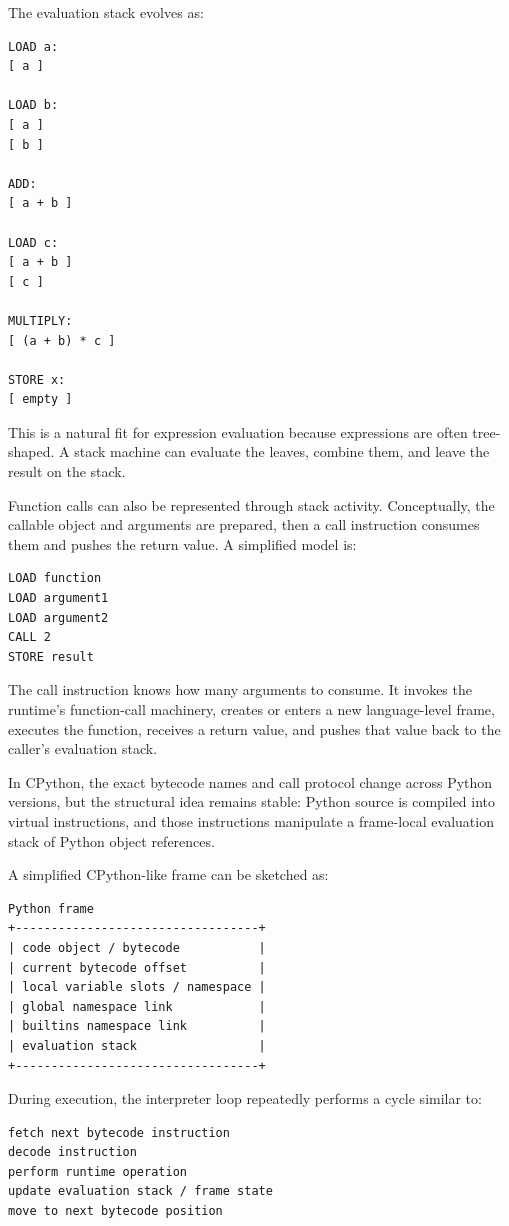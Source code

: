 The evaluation stack evolves as:

\begin{verbatim}
LOAD a:
[ a ]

LOAD b:
[ a ]
[ b ]

ADD:
[ a + b ]

LOAD c:
[ a + b ]
[ c ]

MULTIPLY:
[ (a + b) * c ]

STORE x:
[ empty ]
\end{verbatim}

This is a natural fit for expression evaluation because expressions are often tree-shaped. A stack machine can evaluate the leaves, combine them, and leave the result on the stack.

Function calls can also be represented through stack activity. Conceptually, the callable object and arguments are prepared, then a call instruction consumes them and pushes the return value. A simplified model is:

\begin{verbatim}
LOAD function
LOAD argument1
LOAD argument2
CALL 2
STORE result
\end{verbatim}

The call instruction knows how many arguments to consume. It invokes the runtime's function-call machinery, creates or enters a new language-level frame, executes the function, receives a return value, and pushes that value back to the caller's evaluation stack.

In CPython, the exact bytecode names and call protocol change across Python versions, but the structural idea remains stable: Python source is compiled into virtual instructions, and those instructions manipulate a frame-local evaluation stack of Python object references.

A simplified CPython-like frame can be sketched as:

\begin{verbatim}
Python frame
+----------------------------------+
| code object / bytecode           |
| current bytecode offset          |
| local variable slots / namespace |
| global namespace link            |
| builtins namespace link          |
| evaluation stack                 |
+----------------------------------+
\end{verbatim}

During execution, the interpreter loop repeatedly performs a cycle similar to:

\begin{verbatim}
fetch next bytecode instruction
decode instruction
perform runtime operation
update evaluation stack / frame state
move to next bytecode position
\end{verbatim}

